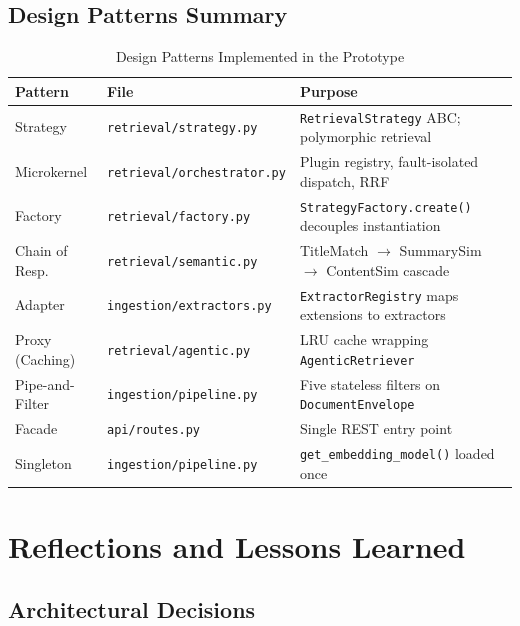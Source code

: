 \documentclass[11pt,a4paper]{article}
\begin{document}
\subsection{Design Patterns Summary}

\begin{table}[H]
\centering
\small
\begin{tabularx}{\textwidth}{llX}
\toprule
\textbf{Pattern} & \textbf{File} & \textbf{Purpose} \\
\midrule
Strategy & \texttt{retrieval/strategy.py} & \texttt{RetrievalStrategy} ABC; polymorphic retrieval \\
Microkernel & \texttt{retrieval/orchestrator.py} & Plugin registry, fault-isolated dispatch, RRF \\
Factory & \texttt{retrieval/factory.py} & \texttt{StrategyFactory.create()} decouples instantiation \\
Chain of Resp. & \texttt{retrieval/semantic.py} & TitleMatch $\to$ SummarySim $\to$ ContentSim cascade \\
Adapter & \texttt{ingestion/extractors.py} & \texttt{ExtractorRegistry} maps extensions to extractors \\
Proxy (Caching) & \texttt{retrieval/agentic.py} & LRU cache wrapping \texttt{AgenticRetriever} \\
Pipe-and-Filter & \texttt{ingestion/pipeline.py} & Five stateless filters on \texttt{DocumentEnvelope} \\
Facade & \texttt{api/routes.py} & Single REST entry point \\
Singleton & \texttt{ingestion/pipeline.py} & \texttt{get\_embedding\_model()} loaded once \\
\bottomrule
\end{tabularx}
\caption{Design Patterns Implemented in the Prototype}
\end{table}


\section{Reflections and Lessons Learned}

\subsection{Architectural Decisions}
\end{document}
